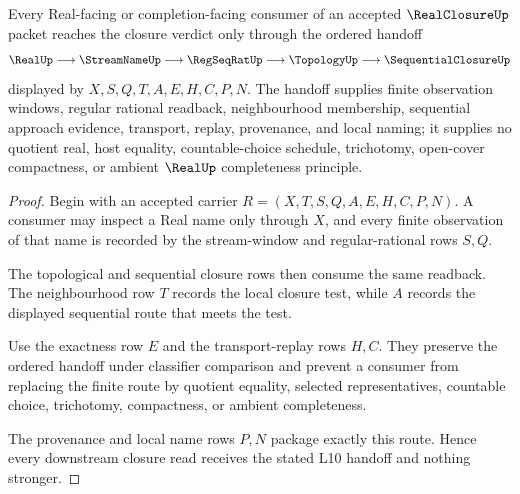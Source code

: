 \begin{theorem}
\label{thm:real-closure-stream-regseqrat-handoff}
Every Real-facing or completion-facing consumer of an accepted $\RealClosureUp$ packet reaches the closure verdict only through the ordered handoff
$$
\RealUp \longrightarrow \StreamNameUp \longrightarrow \RegSeqRatUp \longrightarrow \TopologyUp \longrightarrow \SequentialClosureUp
$$
displayed by $X,S,Q,T,A,E,H,C,P,N$. The handoff supplies finite observation windows, regular rational readback, neighbourhood membership, sequential approach evidence, transport, replay, provenance, and local naming; it supplies no quotient real, host equality, countable-choice schedule, trichotomy, open-cover compactness, or ambient $\RealUp$ completeness principle.
\end{theorem}
\begin{proof}
Begin with an accepted carrier $R=(X,T,S,Q,A,E,H,C,P,N)$. A consumer may inspect a Real name only through $X$, and every finite observation of that name is recorded by the stream-window and regular-rational rows $S,Q$.

The topological and sequential closure rows then consume the same readback. The neighbourhood row $T$ records the local closure test, while $A$ records the displayed sequential route that meets the test.

Use the exactness row $E$ and the transport-replay rows $H,C$. They preserve the ordered handoff under classifier comparison and prevent a consumer from replacing the finite route by quotient equality, selected representatives, countable choice, trichotomy, compactness, or ambient completeness.

The provenance and local name rows $P,N$ package exactly this route. Hence every downstream closure read receives the stated L10 handoff and nothing stronger.
\end{proof}


\begin{closurestatus}{\RealClosureUp}
  \theoryclosure{\seedClosure}
  \formalstatus{\unformalizedV}
\end{closurestatus}
